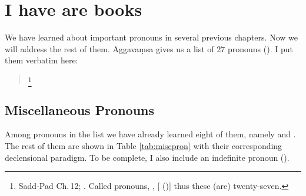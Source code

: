 \chapter{ I have are  books}\label{chap:pron-misc}

We have learned about important pronouns in several previous chapters. Now we will address the rest of them. Aggava\d msa gives us a list of 27 pronouns (). I put them verbatim here:

\begin{quote}\label{par:sabbanamani}
\footnote{Sadd-Pad Ch.\,12; \citealp[p.~266]{smith:sadd1}. Called pronouns, , [ ()] thus these (are) twenty-seven.}
\end{quote}

{}
\section*{Miscellaneous Pronouns}

Among pronouns in the list we have already learned eight of them, namely  and . The rest of them are shown in Table \ref{tab:miscpron} with their corresponding declensional paradigm. To be complete, I also include an indefinite pronoun  ().

